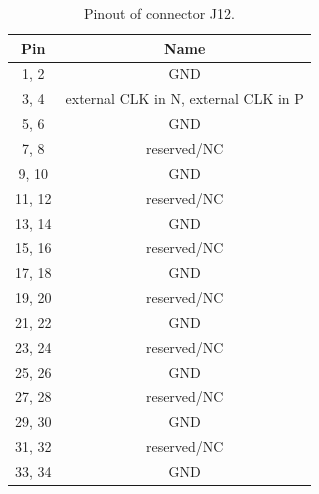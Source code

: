     \begin{table}
    \begin{small}
        \centering
            \begin{tabular}{|c|c|}
                \hline
                Pin & Name\\
                \hline\hline
                1, 2 & GND\\
                \hline
                3, 4 & external CLK in N, external CLK in P\\
                \hline
                5, 6 & GND\\
                \hline
                7, 8 & reserved/NC\\
                \hline
                9, 10 & GND\\
                \hline
                11, 12 & reserved/NC\\
                \hline
                13, 14 & GND\\
                \hline
                15, 16 & reserved/NC\\
                \hline
                17, 18 & GND\\
                \hline
                19, 20 & reserved/NC\\
                \hline
                21, 22 & GND\\
                \hline
                23, 24 & reserved/NC\\
                \hline
                25, 26 & GND\\
                \hline
                27, 28 & reserved/NC\\
                \hline
                29, 30 & GND\\
                \hline
                31, 32 & reserved/NC\\
                \hline
                33, 34 & GND\\
                \hline
            \end{tabular}
            \caption{Pinout of connector J12.}
            \label{J12}
    \end{small}
    \end{table}

